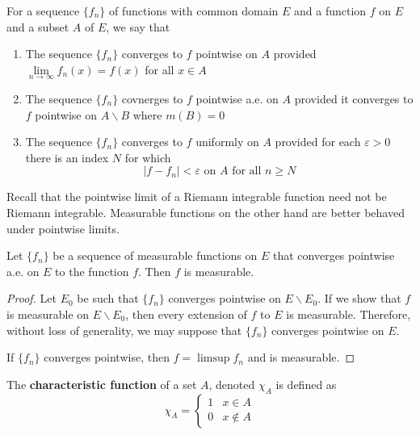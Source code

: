 \begin{definition}
    For a sequence $\{f_n\}$ of functions with common domain $E$ and a function $f$ on $E$ and a subset $A$ of $E$, we say that 
    \begin{enumerate}[label=(\roman*)]
        \item The sequence $\{f_n\}$ converges to $f$ pointwise on $A$ provided $\lim\limits_{n\to\infty} f_n(x) = f(x)$ for all $x\in A$
        \item The sequence $\{f_n\}$ covnerges to $f$ pointwise a.e. on $A$ provided it converges to $f$ pointwise on $A\backslash B$ where $m(B) = 0$ 
        \item The sequence $\{f_n\}$ converges to $f$ uniformly on $A$ provided for each $\varepsilon > 0$ there is an index $N$ for which 
        \begin{equation*}
            |f - f_n| < \varepsilon \text{ on $A$ for all $n\ge N$}
        \end{equation*}
    \end{enumerate}
\end{definition}

Recall that the pointwise limit of a Riemann integrable function need not be Riemann integrable. Measurable functions on the other hand are better behaved under pointwise limits.

\begin{proposition}
    Let $\{f_n\}$ be a sequence of measurable functions on $E$ that converges pointwise a.e. on $E$ to the function $f$. Then $f$ is measurable.
\end{proposition}
\begin{proof}
    Let $E_0$ be such that $\{f_n\}$ converges pointwise on $E\backslash E_0$. If we show that $f$ is measurable on $E\backslash E_0$, then every extension of $f$ to $E$ is measurable. Therefore, without loss of generality, we may suppose that $\{f_n\}$ converges pointwise on $E$. 

    If $\{f_n\}$ converges pointwise, then $f = \limsup f_n$ and is measurable.
\end{proof}

The \textbf{characteristic function} of a set $A$, denoted $\chi_A$ is defined as 
\begin{equation*}
    \chi_A = 
    \begin{cases}
        1 & x\in A\\
        0 & x\notin A
    \end{cases}
\end{equation*}


